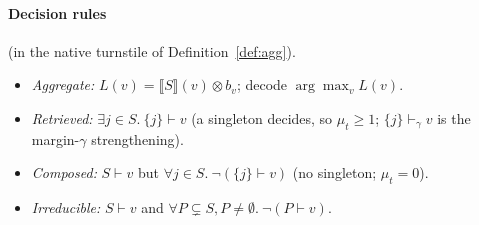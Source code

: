 \documentclass[11pt]{article}
\theoremstyle{definition}
\theoremstyle{plain}
\theoremstyle{remark}
\begin{document}
\paragraph{Decision rules} (in the native turnstile of Definition~\ref{def:agg}).
\begin{itemize}[nosep]
  \item \emph{Aggregate:} $L(v)=\llbracket S\rrbracket(v)\otimes b_v$; decode $\arg\max_v L(v)$.
  \item \emph{Retrieved:} $\exists j\in S.\ \{j\}\vdash v$ (a singleton decides, so $\mu_t\ge1$;
        $\{j\}\vdash_\gamma v$ is the margin-$\gamma$ strengthening).
  \item \emph{Composed:} $S\vdash v$ but $\forall j\in S.\ \neg(\{j\}\vdash v)$ (no singleton; $\mu_t=0$).
  \item \emph{Irreducible:} $S\vdash v$ and $\forall P\subsetneq S,P\neq\emptyset.\ \neg(P\vdash v)$.
\end{itemize}
\end{document}
